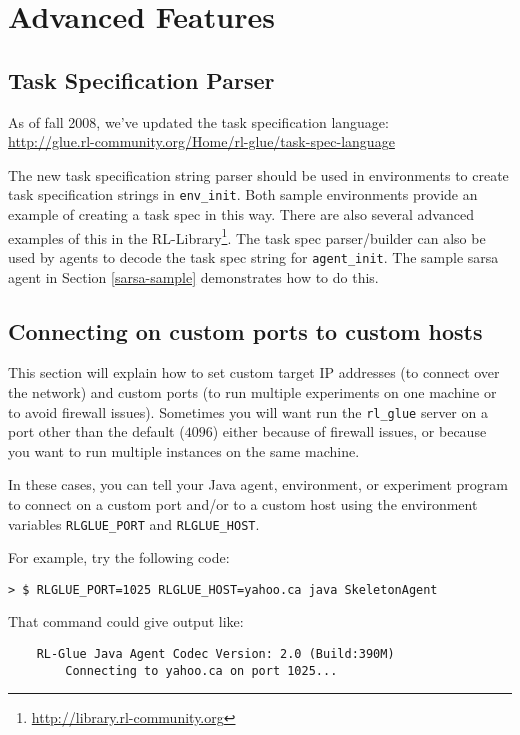 \documentclass[11pt]{article}
\begin{document}
\section{Advanced Features}
\subsection{Task Specification Parser}
As of fall 2008, we've updated the task specification language:\\
\url{http://glue.rl-community.org/Home/rl-glue/task-spec-language}

The new task specification string parser should be used in environments to create task specification strings in \texttt{env\_init}.  Both sample environments provide an example of creating a task spec in this way.  There are also several advanced examples of this in the RL-Library\footnote{\url{http://library.rl-community.org}}.  The task spec parser/builder can also be used by agents to decode the task spec string for \texttt{agent\_init}.  The sample sarsa agent in Section \ref{sarsa-sample} demonstrates how to do this.


\subsection{Connecting on custom ports to custom hosts}
This section will explain how to set custom target IP addresses (to connect over the network) and custom ports (to run multiple experiments on one machine or to avoid firewall issues).
Sometimes you will want run the \texttt{rl\_glue} server on a port other than the default
($4096$) either because of firewall issues, or because you want to run multiple instances on the same machine.

In these cases, you can tell your Java agent, environment, or experiment program to connect on a custom port and/or to a custom host using the environment variables \texttt{RLGLUE\_PORT} and \texttt{RLGLUE\_HOST}.

For example, try the following code:
\begin{verbatim}
> $ RLGLUE_PORT=1025 RLGLUE_HOST=yahoo.ca java SkeletonAgent
\end{verbatim}

That command could give output like:
\begin{verbatim}
	RL-Glue Java Agent Codec Version: 2.0 (Build:390M)
		Connecting to yahoo.ca on port 1025...
\end{verbatim}
\end{document}
